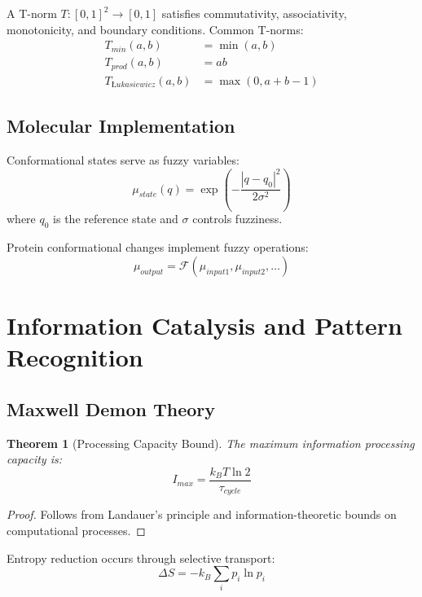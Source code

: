 \documentclass[12pt]{article}
\newtheorem{theorem}{Theorem}[section]
\begin{document}
A T-norm $T: [0,1]^2 \rightarrow [0,1]$ satisfies commutativity, associativity, monotonicity, and boundary conditions. Common T-norms:
\begin{align}
T_{min}(a,b) &= \min(a,b) \\
T_{prod}(a,b) &= ab \\
T_{Łukasiewicz}(a,b) &= \max(0, a+b-1)
\end{align}

\subsection{Molecular Implementation}

Conformational states serve as fuzzy variables:
\begin{equation}
\mu_{state}(q) = \exp\left(-\frac{|q - q_0|^2}{2\sigma^2}\right)
\end{equation}
where $q_0$ is the reference state and $\sigma$ controls fuzziness.

Protein conformational changes implement fuzzy operations:
\begin{equation}
\mu_{output} = \mathcal{F}(\mu_{input1}, \mu_{input2}, \ldots)
\end{equation}

\section{Information Catalysis and Pattern Recognition}

\subsection{Maxwell Demon Theory}

\begin{theorem}[Processing Capacity Bound]
The maximum information processing capacity is:
\begin{equation}
I_{max} = \frac{k_B T \ln 2}{\tau_{cycle}}
\end{equation}
\end{theorem}

\begin{proof}
Follows from Landauer's principle and information-theoretic bounds on computational processes.
\end{proof}

Entropy reduction occurs through selective transport:
\begin{equation}
\Delta S = -k_B \sum_i p_i \ln p_i
\end{equation}
\end{document}
